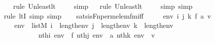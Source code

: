\begin{isabellebody}
\ \ \isamarkupfalse%
{\isacharparenleft}{\kern0pt}rule\ Un{\isacharunderscore}{\kern0pt}least{\isacharunderscore}{\kern0pt}lt{\isacharparenright}{\kern0pt}{\isacharplus}{\kern0pt}\isanewline
\ \ \ \isamarkupfalse%
\ simp\isanewline
\ \ \isamarkupfalse%
{\isacharparenleft}{\kern0pt}rule\ Un{\isacharunderscore}{\kern0pt}least{\isacharunderscore}{\kern0pt}lt{\isacharparenright}{\kern0pt}{\isacharplus}{\kern0pt}\isanewline
\ \ \ \isamarkupfalse%
\ {\isacharparenleft}{\kern0pt}simp{\isacharcomma}{\kern0pt}\ simp{\isacharparenright}{\kern0pt}\isanewline
\ \ \isamarkupfalse%
{\isacharparenleft}{\kern0pt}rule\ ltI{\isacharcomma}{\kern0pt}\ simp{\isacharcomma}{\kern0pt}\ simp{\isacharparenright}{\kern0pt}\isanewline
\ \ \isamarkupfalse%
%
\endisatagproof
{\isafoldproof}%
%
\isadelimproof
\isanewline
%
\endisadelimproof
\isanewline
{}\isamarkupfalse%
\ sats{\isacharunderscore}{\kern0pt}is{\isacharunderscore}{\kern0pt}Fn{\isacharunderscore}{\kern0pt}perm{\isacharunderscore}{\kern0pt}elem{\isacharunderscore}{\kern0pt}fm{\isacharunderscore}{\kern0pt}iff\ {\isacharcolon}{\kern0pt}\ \isanewline
\ \ \ env\ i\ j\ k\ f\ a\ v\isanewline
\ \ \ {\isachardoublequoteopen}env\ {\isasymin}\ list{\isacharparenleft}{\kern0pt}M{\isacharparenright}{\kern0pt}{\isachardoublequoteclose}\ {\isachardoublequoteopen}i\ {\isacharless}{\kern0pt}\ length{\isacharparenleft}{\kern0pt}env{\isacharparenright}{\kern0pt}{\isachardoublequoteclose}\ {\isachardoublequoteopen}j\ {\isacharless}{\kern0pt}\ length{\isacharparenleft}{\kern0pt}env{\isacharparenright}{\kern0pt}{\isachardoublequoteclose}\ {\isachardoublequoteopen}k\ {\isacharless}{\kern0pt}\ length{\isacharparenleft}{\kern0pt}env{\isacharparenright}{\kern0pt}{\isachardoublequoteclose}\isanewline
\ \ \ \ \ \ \ \ \ \ {\isachardoublequoteopen}nth{\isacharparenleft}{\kern0pt}i{\isacharcomma}{\kern0pt}\ env{\isacharparenright}{\kern0pt}\ {\isacharequal}{\kern0pt}\ f{\isachardoublequoteclose}\ {\isachardoublequoteopen}nth{\isacharparenleft}{\kern0pt}j{\isacharcomma}{\kern0pt}\ env{\isacharparenright}{\kern0pt}\ {\isacharequal}{\kern0pt}\ a{\isachardoublequoteclose}\ {\isachardoublequoteopen}nth{\isacharparenleft}{\kern0pt}k{\isacharcomma}{\kern0pt}\ env{\isacharparenright}{\kern0pt}\ {\isacharequal}{\kern0pt}\ v{\isachardoublequoteclose}\ \isanewline

\end{isabellebody}
